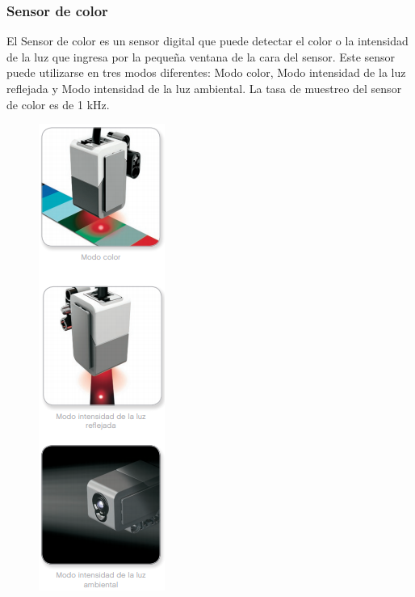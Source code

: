 \subsubsection{Sensor de color}
	 El Sensor de color es un sensor digital que puede detectar el color o la intensidad de la luz que ingresa por la pequeña ventana de la cara del sensor. Este sensor puede utilizarse en tres modos diferentes: Modo color, Modo intensidad de la luz reflejada y Modo intensidad de la luz ambiental.\newline
La tasa de muestreo del sensor de color es de 1 kHz.\newline
\begin{figure}
    \centering
    \includegraphics[width=0.6\linewidth]{img/color.png}

\end{figure}
